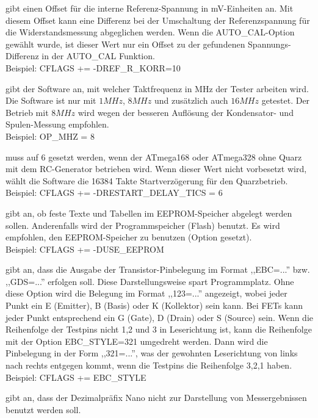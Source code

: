 \begin{description} \setlength{\itemsep}{0em}
  \item[REF\_R\_KORR] gibt einen Offset für die interne Referenz-Spannung in mV-Einheiten an.
Mit diesem Offset kann eine Differenz bei der Umschaltung der Referenzspannung für die Widerstandsmessung abgeglichen werden.
Wenn die AUTO\_CAL-Option gewählt wurde, ist dieser Wert nur ein Offset zu der gefundenen Spannungs-Differenz in der
AUTO\_CAL Funktion.\\
Beispiel: CFLAGS += -DREF\_R\_KORR=10
  \item[OP\_MHZ] gibt der Software an, mit welcher Taktfrequenz in MHz der Tester arbeiten wird.
Die Software ist nur mit \(1MHz\), \(8MHz\) und zusätzlich auch \(16MHz\) getestet. Der Betrieb mit \(8MHz\) wird wegen der besseren Auflösung der
Kondensator- und Spulen-Messung empfohlen.\\
Beispiel: OP\_MHZ = 8
  \item[RESTART\_DELAY\_TICS] muss auf 6 gesetzt werden, wenn der ATmega168 oder ATmega328 ohne Quarz mit dem
RC-Generator betrieben wird. Wenn dieser Wert nicht vorbesetzt wird, wählt die Software die 16384 Takte Startverzögerung für
den Quarzbetrieb.\\
Beispiel: CFLAGS += -DRESTART\_DELAY\_TICS = 6
  \item[USE\_EEPROM] gibt an, ob feste Texte und Tabellen im EEPROM-Speicher abgelegt werden sollen.
Anderenfalls wird der Programmspeicher (Flash) benutzt.
Es wird empfohlen, den EEPROM-Speicher zu benutzen (Option gesetzt).\\
Beispiel: CFLAGS += -DUSE\_EEPROM
  \item[EBC\_STYLE] gibt an, dass die Ausgabe der Transistor-Pinbelegung im Format ,,EBC=...'' bzw. ,,GDS=...'' erfolgen soll.
Diese Darstellungsweise spart Programmplatz. Ohne diese Option wird die Belegung im Format ,,123=...'' angezeigt, wobei
jeder Punkt ein E (Emitter), B (Basis) oder K (Kollektor) sein kann.
Bei FETs kann jeder Punkt entsprechend ein G (Gate), D (Drain) oder S (Source) sein.
Wenn die Reihenfolge der Testpins nicht 1,2 und 3 in Leserichtung ist, kann die Reihenfolge mit der Option EBC\_STYLE=321 
umgedreht werden. Dann wird die Pinbelegung in der Form ,,321=...'', was der gewohnten Leserichtung von links nach rechts
entgegen kommt, wenn die Testpins die Reihenfolge 3,2,1 haben.\\
Beispiel: CFLAGS += EBC\_STYLE
  \item[NO\_NANO] gibt an, dass der Dezimalpräfix Nano nicht zur Darstellung von Messergebnissen benutzt werden soll.

\end{description}
